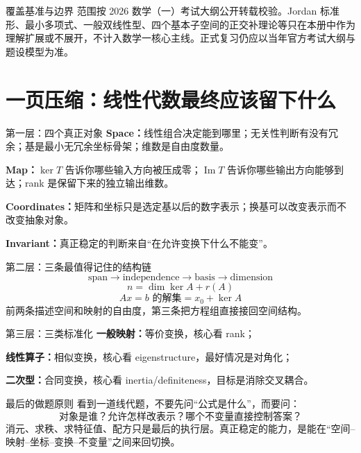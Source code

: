 \documentclass[11pt,a4paper,openany]{ctexbook}
\begin{document}
\begin{methodbox}{覆盖基准与边界}
范围按 2026 数学（一）考试大纲公开转载校验。Jordan 标准形、最小多项式、一般双线性型、四个基本子空间的正交补理论等只在本册中作为理解扩展或不展开，不计入数学一核心主线。正式复习仍应以当年官方考试大纲与题设模型为准。
\end{methodbox}

\chapter{一页压缩：线性代数最终应该留下什么}

\begin{corebox}{第一层：四个真正对象}
\textbf{Space：}线性组合决定能到哪里；无关性判断有没有冗余；基是最小无冗余坐标骨架；维数是自由度数量。

\textbf{Map：}$\ker T$ 告诉你哪些输入方向被压成零；$\operatorname{Im}T$ 告诉你哪些输出方向能够到达；rank 是保留下来的独立输出维数。

\textbf{Coordinates：}矩阵和坐标只是选定基以后的数字表示；换基可以改变表示而不改变抽象对象。

\textbf{Invariant：}真正稳定的判断来自“在允许变换下什么不能变”。
\end{corebox}

\begin{corebox}{第二层：三条最值得记住的结构链}
\[
\boxed{\text{span}\to\text{independence}\to\text{basis}\to\text{dimension}}
\]
\[
\boxed{n=\dim\ker A+r(A)}
\]
\[
\boxed{Ax=b\text{ 的解集}=x_0+\ker A}
\]
前两条描述空间和映射的自由度，第三条把方程组直接接回空间结构。
\end{corebox}

\begin{corebox}{第三层：三类标准化}
\textbf{一般映射：}等价变换，核心看 rank；

\textbf{线性算子：}相似变换，核心看 eigenstructure，最好情况是对角化；

\textbf{二次型：}合同变换，核心看 inertia/definiteness，目标是消除交叉耦合。
\end{corebox}

\begin{corebox}{最后的做题原则}
看到一道线代题，不要先问“公式是什么”，而要问：
\[
\boxed{\text{对象是谁？允许怎样改表示？哪个不变量直接控制答案？}}
\]
消元、求秩、求特征值、配方只是最后的执行层。真正稳定的能力，是能在“空间--映射--坐标--变换--不变量”之间来回切换。
\end{corebox}
\end{document}
